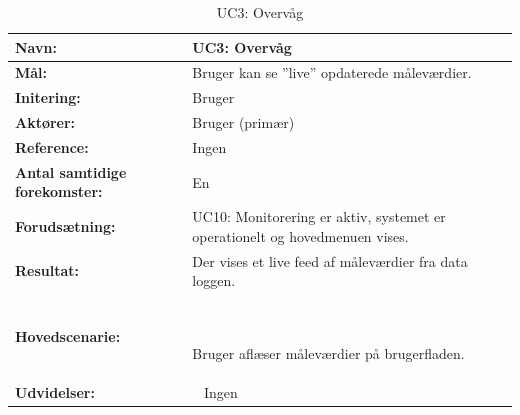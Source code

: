 \begin{table}[h]
\begin{tabularx}{\textwidth}{| >{\raggedright\arraybackslash}p{3.3 cm} | >{\raggedright\arraybackslash}X |} \hline

\textbf{Navn:} 						& UC3: Overvåg\\ \hline
\textbf{Mål:}						& Bruger kan se ”live” opdaterede måleværdier. \\ \hline
\textbf{Initering:}					& Bruger \\ \hline
\textbf{Aktører:} 					& Bruger (primær) \\ \hline
\textbf{Reference:} 					& Ingen \\ \hline
\textbf{Antal samtidige forekomster:} & En \\ \hline
\textbf{Forudsætning:} 				& UC10: Monitorering er aktiv, systemet er operationelt og hovedmenuen vises. \\ \hline
\textbf{Resultat:}					& Der vises et live feed af måleværdier fra data loggen. \\ \hline
\textbf{Hovedscenarie:}				& ~

\begin{packed_enum}
\item Bruger aflæser måleværdier på brugerfladen.
\end{packed_enum} \\ \hline
\textbf{Udvidelser:}				& ~
Ingen \\ \hline
\end{tabularx}

\clearpage

\caption{UC3: Overvåg}
\label{tbl:UC3}
\end{table}

